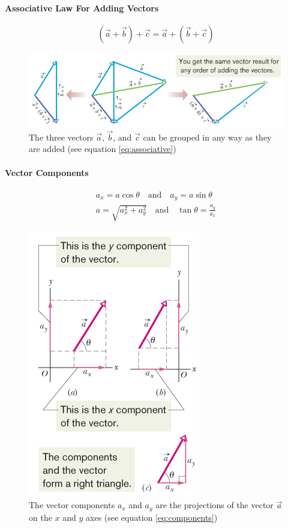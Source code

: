 \documentclass{article}
\begin{document}
        \paragraph{Associative Law For Adding Vectors}
        \begin{equation} \label{eq:associative}
            \left( \vec{a} + \vec{b} \right) + \vec{c} = \vec{a} + \left( \vec{b} + \vec{c} \right)
        \end{equation}
        \begin{figure}[H]
            \centering
            \includegraphics[scale=0.6]{associative}
            \caption{The three vectors $\vec{a}$, $\vec{b}$, and $\vec{c}$ can be grouped in any way as they are added (see equation \ref{eq:associative})}
        \end{figure}

        \paragraph{Vector Components}
        \begin{align} \label{eq:components}
            a_x = a \cos{\theta} \quad\text{and}\quad a_y = a \sin{\theta} \\
            a = \sqrt{a_x^2 + a_y^2} \quad\text{and}\quad \tan{\theta} = \frac{a_y}{a_x}
        \end{align}
        \begin{figure}[H]
            \centering
            \includegraphics[scale=0.6]{components}
            \caption{The vector components $a_x$ and $a_y$ are the projections of the vector $\vec{a}$ on the $x$ and $y$ axes (see equation \ref{eq:components})}
        \end{figure}
    
\end{document}
